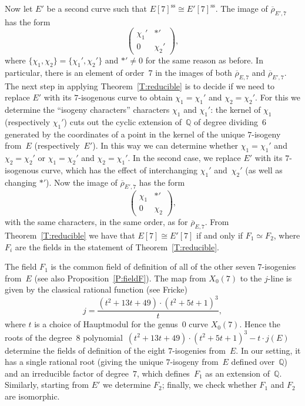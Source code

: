 \documentclass[twoside,leqno,symbols-for-thanks, draft]{rmi}
\numberwithin{equation}{section}
\newcommand{\Q}{\mathbb{Q}}
\newcommand{\rhobar}{{\overline{\rho}}}
\DeclareMathOperator{\sss}{ss}
\theoremstyle{remark}
\begin{document}
Now let $E'$ be a second curve such that $E[7]^{\sss}\cong
E'[7]^{\sss}$. 
The image of $\rhobar_{E',7}$ has the form
\[
  \begin{pmatrix}\chi_1'&*'\\0&\chi_2'  \end{pmatrix},
  \]
where $\{\chi_1,\chi_2\}=\{\chi_1',\chi_2'\}$ and $*' \neq 0$ for the
same reason as before.  In particular, there is an element of
order~$7$ in the images of both $\rhobar_{E,7}$ and $\rhobar_{E',7}$.
The next step in applying Theorem~\ref{T:reducible} is to decide if we
need to replace $E'$ with its $7$-isogenous curve to obtain
$\chi_1=\chi_1'$ and $\chi_2=\chi_2'$. For this we determine the
``isogeny characters'' characters $\chi_1$ and $\chi_1'$: the kernel
of $\chi_1$ (respectively $\chi_1'$) cuts out the cyclic extension
of~$\Q$ of degree dividing~$6$ generated by the coordinates of a point
in the kernel of the unique $7$-isogeny from~$E$ (respectively~$E'$).
In this way we can determine whether $\chi_1=\chi_1'$ and
$\chi_2=\chi_2'$ or $\chi_1=\chi_2'$ and $\chi_2=\chi_1'$.  In the
second case, we replace $E'$ with its $7$-isogenous curve, which has
the effect of interchanging $\chi_1'$ and~$\chi_2'$ (as well as
changing $*'$).  Now the image of $\rhobar_{E',7}$ has the form
\[
\begin{pmatrix}\chi_1&*'\\0&\chi_2  \end{pmatrix},
\]
with the same characters, in the same order, as for
$\rhobar_{E,7}$. From Theorem~\ref{T:reducible} we have that
$E[7]\cong E'[7]$ if and only if $F_1 \simeq F_2$, where $F_i$ are the
fields in the statement of Theorem~\ref{T:reducible}.

The field $F_1$ is the common field of definition of all of the other
seven $7$-isogenies from~$E$ (see also Proposition~\ref{P:fieldF}).
The map from $X_0(7)$ to the $j$-line is given by the classical
rational function (see Fricke)
\[
   j = \frac{(t^{2} + 13t + 49) \cdot (t^{2} + 5t + 1)^{3}}{t},
\]
where $t$ is a choice of Hauptmodul for the genus~$0$ curve
$X_0(7)$. Hence the roots of the degree~$8$ polynomial~$(t^{2} + 13t +
49) \cdot (t^{2} + 5t + 1)^{3} -t\cdot j(E)$ determine the fields of
definition of the eight $7$-isogenies from~$E$. In our setting, it has
a single rational root (giving the unique $7$-isogeny from~$E$ defined
over~$\Q$) and an irreducible factor of degree~$7$, which
defines~$F_1$ as an extension of~$\Q$. Similarly, starting from $E'$
we determine $F_2$; finally, we check whether $F_1$ and $F_2$ are
isomorphic.
\end{document}
